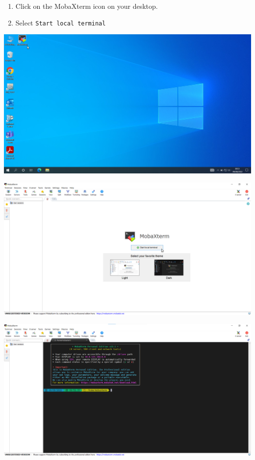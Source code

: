 \documentclass[
  letterpaper,
  DIV=11,
  numbers=noendperiod]{scrreprt}
\providecommand{\tightlist}{%
  \setlength{\itemsep}{0pt}\setlength{\parskip}{0pt}}\usepackage{longtable,booktabs,array}
\begin{document}
\begin{enumerate}
\def\labelenumi{\arabic{enumi}.}
\tightlist
\item
  Click on the MobaXterm icon on your desktop.
\item
  Select \texttt{Start\ local\ terminal}
\end{enumerate}

\includegraphics[width=1\linewidth,height=\textheight,keepaspectratio]{images/windows-desktop.png}

\includegraphics[width=1\linewidth,height=\textheight,keepaspectratio]{images/mobaxterm-opening.png}

\includegraphics[width=1\linewidth,height=\textheight,keepaspectratio]{images/mobaxterm-terminal.png}
\end{document}
